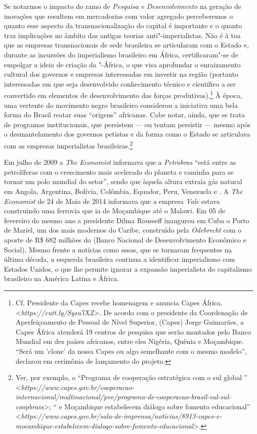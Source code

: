 Se notarmos o impacto do ramo de \emph{Pesquisa e Desenvolvimento} na
geração de inovações que resultem em mercadorias com valor agregado
perceberemos o quanto esse aspecto da transnacionalização do capital é
importante e o quanto traz implicações no âmbito das antigas teorias
anti"-imperialistas. Não é à toa que as empresas transnacionais de sede
brasileira se articularam com o Estado e, durante as incursões do
imperialismo brasileiro em África, certificaram"-se de empolgar a ideia
de criação da "-África, o que visa aprofundar o enraizamento
cultural dos governos e empresas interessadas em investir na região
(portanto interessadas em que seja desenvolvido conhecimento técnico e
científico a ser convertido em elementos de desenvolvimento das forças
produtivas).\footnote{Cf. Presidente da Capes recebe homenagem e anuncia
  Capes África.
  \textless{}\emph{https://cutt.ly/Sysu7XZ}\textgreater{}.
  De acordo com o presidente da Coordenação de Aperfeiçoamento de
  Pessoal de Nível Superior, (Capes) Jorge Guimarães, a Capes África
  atenderá 19 centros de pesquisa que serão montados pelo Banco Mundial
  em dez países africanos, entre eles Nigéria, Quênia e Moçambique.
  ``Será um 'clone' da nossa Capes ou algo semelhante com o mesmo
  modelo'', declarou em cerimônia de lançamento do projeto.} À época,
uma vertente do movimento negro brasileiro considerou a iniciativa uma
bela forma do Brasil reatar suas ``origens'' africanas. Cabe notar,
ainda, que se trata de programas institucionais, que persistem --- ou
tentam persistir --- mesmo após o desmantelamento dos governos petistas e
da forma como o Estado se articulava com as empresas imperialistas
brasileiras.\footnote{Ver, por exemplo, o ``Programa de cooperação
  estratégica com o sul global ''
  \textless{}\emph{https://www.capes.gov.br/cooperacao-internacional/multinacional/pve/programa-de-cooperacao-brasil-sul-sul-coopbrass}\textgreater{};
  `` e Moçambique estabelecem diálogo sobre fomento educacional''
  \textless{}\emph{https://www.capes.gov.br/sala-de-imprensa/noticias/8913-capes-e-mocambique-estabelecem-dialogo-sobre-fomento-educacional}\textgreater{}.}

Em julho de 2009 a \emph{The Economist} informava que a \emph{Petrobras}
``está entre as petrolíferas com o crescimento mais acelerado do planeta
e caminha para se tornar um polo mundial do setor'', sendo que àquela
altura extraía gás natural em Angola, Argentina, Bolívia, Colômbia,
Equador, Peru, Venezuela e . A \emph{The Economist} de 24 de Maio de
2014 informava que a empresa \emph{Vale} estava construindo uma ferrovia
que ia de Moçambique até o Malawi. Em 05 de fevereiro do mesmo ano a
presidente Dilma Rousseff inaugurou em Cuba o Porto de Mariel, um dos
mais modernos do Caribe, construído pela \emph{Odebrecht} com o aporte
de R\$ 682 milhões do  (Banco Nacional de Desenvolvimento Econômico
e Social). Mesmo frente a notícias como essas, que se tornaram
frequentes na última década, a esquerda brasileira continua a
identificar imperialismo com Estados Unidos, o que lhe permite ignorar a
expansão imperialista do capitalismo brasileiro na América Latina e
África.

